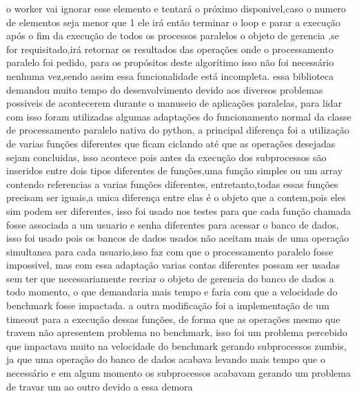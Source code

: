 \documentclass[
	12pt,				%
	openright,			%
	oneside,			%
	a4paper,			%
	english,			%
	french,				%
	spanish,			%
	brazil,				%
	]{abntex2}
\begin{document}
o worker vai ignorar esse elemento e tentará o próximo disponivel,caso o numero de elementos seja menor que 1 ele irá então terminar o loop e parar a execução
após o fim da execução de todos os processos paralelos o objeto de gerencia ,se for requisitado,irá retornar os resultados das operações onde o processamento paralelo foi pedido,
para os propósitos deste algorítimo isso não foi necessário nenhuma vez,sendo assim essa funcionalidade está incompleta.
essa biblioteca demandou muito tempo do desenvolvimento devido aos diversos problemas possiveis de acontecerem durante o manuseio de aplicações paralelas,
para lidar com isso foram utilizadas algumas adaptações do funcionamento normal da classe de processamento paralelo nativa do python,
a principal diferença foi a utilização de varias funções diferentes que ficam ciclando até que as operações desejadas sejam concluidas,
isso acontece pois antes da execução dos subprocessos são inseridos entre dois tipos diferentes de funções,uma função simples ou um array contendo referencias a varias funções diferentes,
entretanto,todas essas funções precisam ser iguais,a unica diferença entre elas é o objeto que a contem,pois eles sim podem ser diferentes,
isso foi usado nos testes para que cada função chamada fosse associada a um usuario e senha diferentes para acessar o banco de dados,
isso foi usado pois os bancos de dados usados não aceitam mais de uma operação simultanea para cada usuario,isso faz com que o processamento paralelo fosse impossivel,
mas com essa adaptação varias contas diferentes possam ser usadas sem ter que necessariamente recriar o objeto de gerencia do banco de dados a todo momento,
o que demandaria mais tempo e faria com que a velocidade do benchmark fosse impactada.
a outra modificação foi a implementação de um timeout para a execução dessas funções,
de forma que as operações mesmo que travem não apresentem problema no benchmark,
isso foi um problema percebido que impactava muito na velocidade do benchmark gerando subprocessos zumbis,
ja que uma operação do banco de dados acabava levando mais tempo que o necessário e em algum momento os subprocessos acabavam gerando um problema de travar um ao outro devido a essa demora
\end{document}
